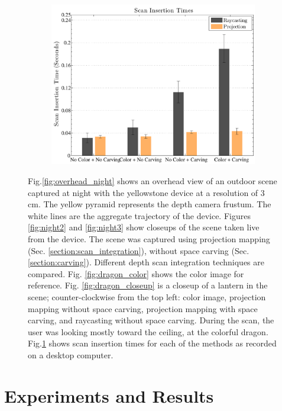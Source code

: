 \documentclass[10pt,twocolumn,letterpaper]{article}
\newcommand{\figref}[1]{Fig.\ref{#1}}
\begin{document}
\begin{figure} [htb]
\begin{subfigure}{0.35\linewidth}
\includegraphics[width=1.0\textwidth]{img/timing_data.pdf}
		 \caption{}
		 \label{fig:timing}
	 \end{subfigure} 
	 \caption{\figref{fig:overhead_night} shows an overhead view of
	 an outdoor scene captured at night with the yellowstone device at a
	 resolution of 3 cm. The yellow pyramid represents the depth camera frustum. The white
	 lines are the aggregate trajectory of the device. Figures \ref{fig:night2}
	 and \ref{fig:night3} show closeups of the scene taken live from the device.
	 The scene was captured using projection mapping (Sec.
	 \ref{section:scan_integration}), without space
	 carving (Sec. \ref{section:carving}). Different depth scan integration techniques are compared. Fig.
	 \ref{fig:dragon_color} shows the color image for reference.  Fig.
	 \ref{fig:dragon_closeup} is a closeup of a lantern in the scene; 
	 counter-clockwise from the top left: color image, projection mapping without
	 space carving, projection mapping with space carving, and raycasting without
	 space carving. During the scan, the user was looking mostly toward the
	 ceiling, at the colorful dragon. \figref{fig:timing} shows
      scan insertion times for each of the methods as recorded on a desktop
      computer.}
	 \label{fig:device_data}
 \end{figure} 


\section{Experiments and Results}
\end{document}

